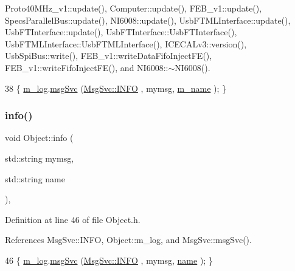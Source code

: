 Proto40\+M\+Hz\+\_\+v1\+::update(), Computer\+::update(), F\+E\+B\+\_\+v1\+::update(), Specs\+Parallel\+Bus\+::update(), N\+I6008\+::update(), Usb\+F\+T\+M\+L\+Interface\+::update(), Usb\+F\+T\+Interface\+::update(), Usb\+F\+T\+Interface\+::\+Usb\+F\+T\+Interface(), Usb\+F\+T\+M\+L\+Interface\+::\+Usb\+F\+T\+M\+L\+Interface(), I\+C\+E\+C\+A\+Lv3\+::version(), Usb\+Spi\+Bus\+::write(), F\+E\+B\+\_\+v1\+::write\+Data\+Fifo\+Inject\+F\+E(), F\+E\+B\+\_\+v1\+::write\+Fifo\+Inject\+F\+E(), and N\+I6008\+::$\sim$\+N\+I6008().


\begin{DoxyCode}
38 \{ \hyperlink{classObject_a0d269813dd7ac1f24bc143031e2963f2}{m\_log}.\hyperlink{classMsgSvc_ad25f18047920cc59a314e5098259711c}{msgSvc} (\hyperlink{classMsgSvc_ae671eb7301996cd049d2da8a65925926ad2fcf3f3e734fc41ee097cc23670ce51}{MsgSvc::INFO}    , mymsg, \hyperlink{classObject_a8b83c95c705d2c3ba0d081fe1710f48d}{m\_name} ); \}
\end{DoxyCode}
\mbox{\label{classObject_a1ca123253dfd30fc28b156f521dcbdae}} 
\subsubsection{\texorpdfstring{info()}{info()}\hspace{0.1cm}{\footnotesize\ttfamily [2/2]}}
{\footnotesize\ttfamily void Object\+::info (\begin{DoxyParamCaption}\item[{std\+::string}]{mymsg,  }\item[{std\+::string}]{name }\end{DoxyParamCaption})\hspace{0.3cm}{\ttfamily [inline]}, {\ttfamily [inherited]}}



Definition at line 46 of file Object.\+h.



References Msg\+Svc\+::\+I\+N\+FO, Object\+::m\+\_\+log, and Msg\+Svc\+::msg\+Svc().


\begin{DoxyCode}
46 \{ \hyperlink{classObject_a0d269813dd7ac1f24bc143031e2963f2}{m\_log}.\hyperlink{classMsgSvc_ad25f18047920cc59a314e5098259711c}{msgSvc} (\hyperlink{classMsgSvc_ae671eb7301996cd049d2da8a65925926ad2fcf3f3e734fc41ee097cc23670ce51}{MsgSvc::INFO}    , mymsg, \hyperlink{classObject_a300f4c05dd468c7bb8b3c968868443c1}{name} ); \}
\end{DoxyCode}
\mbox{\label{classFePGA_a5355858b1b8deedcc12acff80f025804}} 
